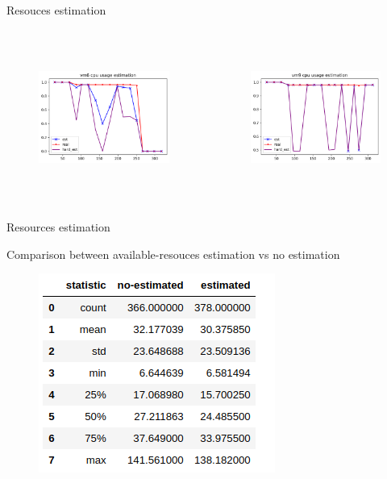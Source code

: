 \documentclass[10pt,xcolor={dvipsnames}, aspectratio=169]{beamer}
\begin{document}
\begin{frame}
{Resouces estimation}
	\begin{columns}
		\begin{column}{0.48\textwidth}
			\begin{figure}
				\centering
				\includegraphics[scale=0.6, height=5cm]{images/cpu_usage_estimation_1.png}
			\end{figure}
		\end{column}

		\hfill		
		
		\begin{column}{0.48\textwidth}
			\begin{figure}
				\centering
				\includegraphics[scale=0.6, height=5cm]{images/cpu_usage_estimation_2.png}
			\end{figure}		
		\end{column}
	\end{columns}
\end{frame}

\begin{frame}
{Resources estimation}
	\begin{block}
	{Comparison between available-resouces estimation vs no estimation}
		\begin{figure}
			\centering
			\includegraphics[scale=0.7]{images/estimate_comparison.png}
		\end{figure}
	\end{block}
\end{frame}


{\1
\begin{frame}
\end{frame}}
\end{document}
